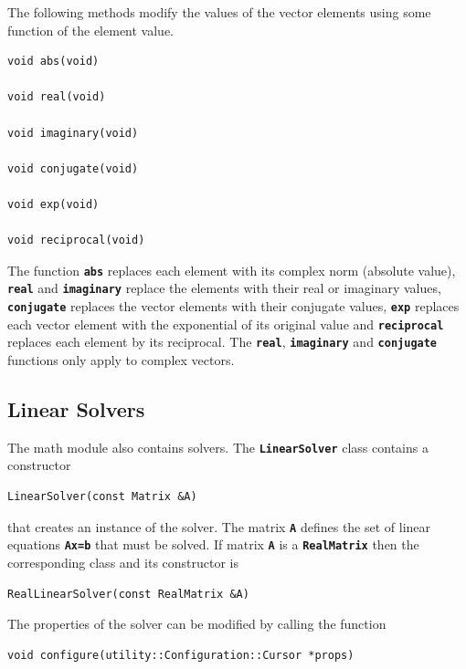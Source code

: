 \documentclass[12pt]{report} %
\begin{document}
The following methods modify the values of the vector elements using some function of the element value.

{
\color{red}
\begin{Verbatim}[fontseries=b]
void abs(void)

void real(void)

void imaginary(void)

void conjugate(void)

void exp(void)

void reciprocal(void)
\end{Verbatim}
}

The function \texttt{\textbf{abs}} replaces each element with its complex norm (absolute value), \texttt{\textbf{real}} and \texttt{\textbf{imaginary}} replace the elements with their real or imaginary values, \texttt{\textbf{conjugate}} replaces the vector elements with their conjugate values, \texttt{\textbf{exp}} replaces each vector element with the exponential of its original value and \texttt{\textbf{reciprocal}} replaces each element by its reciprocal. The \texttt{\textbf{real}}, \texttt{\textbf{imaginary}} and \texttt{\textbf{conjugate}} functions only apply to complex vectors.

\subsection{Linear Solvers}

The math module also contains solvers. The \texttt{\textbf{LinearSolver}} class contains a constructor

{
\color{red}
\begin{Verbatim}[fontseries=b]
LinearSolver(const Matrix &A)
\end{Verbatim}
}

that creates an instance of the solver. The matrix \texttt{\textbf{A}} defines the set of linear equations \texttt{\textbf{Ax=b}} that must be solved. If matrix \texttt{\textbf{A}} is a \texttt{\textbf{RealMatrix}} then the corresponding class and its constructor is

{
\color{red}
\begin{Verbatim}[fontseries=b]
RealLinearSolver(const RealMatrix &A)
\end{Verbatim}
}

The properties of the solver can be modified by calling the function

{
\color{red}
\begin{Verbatim}[fontseries=b]
void configure(utility::Configuration::Cursor *props)
\end{Verbatim}
}
\end{document}
